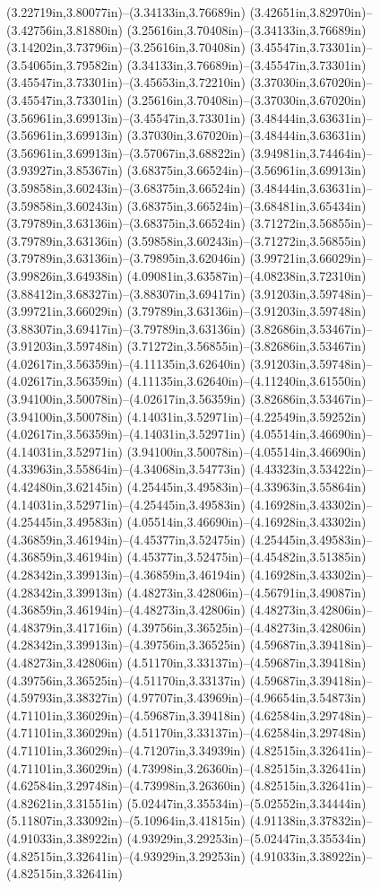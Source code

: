 (3.22719in,3.80077in)--(3.34133in,3.76689in) (3.42651in,3.82970in)--(3.42756in,3.81880in) (3.25616in,3.70408in)--(3.34133in,3.76689in) (3.14202in,3.73796in)--(3.25616in,3.70408in) (3.45547in,3.73301in)--(3.54065in,3.79582in) (3.34133in,3.76689in)--(3.45547in,3.73301in) (3.45547in,3.73301in)--(3.45653in,3.72210in) (3.37030in,3.67020in)--(3.45547in,3.73301in) (3.25616in,3.70408in)--(3.37030in,3.67020in) (3.56961in,3.69913in)--(3.45547in,3.73301in) (3.48444in,3.63631in)--(3.56961in,3.69913in) (3.37030in,3.67020in)--(3.48444in,3.63631in) (3.56961in,3.69913in)--(3.57067in,3.68822in) (3.94981in,3.74464in)--(3.93927in,3.85367in) (3.68375in,3.66524in)--(3.56961in,3.69913in) (3.59858in,3.60243in)--(3.68375in,3.66524in) (3.48444in,3.63631in)--(3.59858in,3.60243in) (3.68375in,3.66524in)--(3.68481in,3.65434in) (3.79789in,3.63136in)--(3.68375in,3.66524in) (3.71272in,3.56855in)--(3.79789in,3.63136in) (3.59858in,3.60243in)--(3.71272in,3.56855in) (3.79789in,3.63136in)--(3.79895in,3.62046in) (3.99721in,3.66029in)--(3.99826in,3.64938in) (4.09081in,3.63587in)--(4.08238in,3.72310in) (3.88412in,3.68327in)--(3.88307in,3.69417in) (3.91203in,3.59748in)--(3.99721in,3.66029in) (3.79789in,3.63136in)--(3.91203in,3.59748in) (3.88307in,3.69417in)--(3.79789in,3.63136in) (3.82686in,3.53467in)--(3.91203in,3.59748in) (3.71272in,3.56855in)--(3.82686in,3.53467in) (4.02617in,3.56359in)--(4.11135in,3.62640in) (3.91203in,3.59748in)--(4.02617in,3.56359in) (4.11135in,3.62640in)--(4.11240in,3.61550in) (3.94100in,3.50078in)--(4.02617in,3.56359in) (3.82686in,3.53467in)--(3.94100in,3.50078in) (4.14031in,3.52971in)--(4.22549in,3.59252in) (4.02617in,3.56359in)--(4.14031in,3.52971in) (4.05514in,3.46690in)--(4.14031in,3.52971in) (3.94100in,3.50078in)--(4.05514in,3.46690in) (4.33963in,3.55864in)--(4.34068in,3.54773in) (4.43323in,3.53422in)--(4.42480in,3.62145in) (4.25445in,3.49583in)--(4.33963in,3.55864in) (4.14031in,3.52971in)--(4.25445in,3.49583in) (4.16928in,3.43302in)--(4.25445in,3.49583in) (4.05514in,3.46690in)--(4.16928in,3.43302in) (4.36859in,3.46194in)--(4.45377in,3.52475in) (4.25445in,3.49583in)--(4.36859in,3.46194in) (4.45377in,3.52475in)--(4.45482in,3.51385in) (4.28342in,3.39913in)--(4.36859in,3.46194in) (4.16928in,3.43302in)--(4.28342in,3.39913in) (4.48273in,3.42806in)--(4.56791in,3.49087in) (4.36859in,3.46194in)--(4.48273in,3.42806in) (4.48273in,3.42806in)--(4.48379in,3.41716in) (4.39756in,3.36525in)--(4.48273in,3.42806in) (4.28342in,3.39913in)--(4.39756in,3.36525in) (4.59687in,3.39418in)--(4.48273in,3.42806in) (4.51170in,3.33137in)--(4.59687in,3.39418in) (4.39756in,3.36525in)--(4.51170in,3.33137in) (4.59687in,3.39418in)--(4.59793in,3.38327in) (4.97707in,3.43969in)--(4.96654in,3.54873in) (4.71101in,3.36029in)--(4.59687in,3.39418in) (4.62584in,3.29748in)--(4.71101in,3.36029in) (4.51170in,3.33137in)--(4.62584in,3.29748in) (4.71101in,3.36029in)--(4.71207in,3.34939in) (4.82515in,3.32641in)--(4.71101in,3.36029in) (4.73998in,3.26360in)--(4.82515in,3.32641in) (4.62584in,3.29748in)--(4.73998in,3.26360in) (4.82515in,3.32641in)--(4.82621in,3.31551in) (5.02447in,3.35534in)--(5.02552in,3.34444in) (5.11807in,3.33092in)--(5.10964in,3.41815in) (4.91138in,3.37832in)--(4.91033in,3.38922in) (4.93929in,3.29253in)--(5.02447in,3.35534in) (4.82515in,3.32641in)--(4.93929in,3.29253in) (4.91033in,3.38922in)--(4.82515in,3.32641in) 